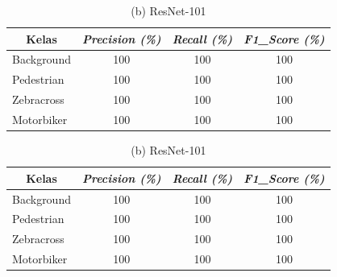 \begin{table}[!h]
	\centering
	\caption{{Perbandingan Hasil Evaluasi pada Pagi Hari}}
	\begin{minipage}[b]{\textwidth}
		\centering
		\caption*{(a) ResNet-50}
		\begin{tabular}{|l|c|c|c|}
			\hline
			\multicolumn{1}{|c|}{\textbf{Kelas}} & \textit{\textbf{Precision (\%)}} & \textit{\textbf{Recall (\%)}} & \textit{\textbf{F1\_Score (\%)}} \\ \hline
			Background                           & 100                              & 100                           & 100                              \\ \hline
			Pedestrian                           & 100                              & 100                           & 100                              \\ \hline
			Zebracross                           & 100                              & 100                           & 100                              \\ \hline
			Motorbiker                           & 100                              & 100                           & 100                              \\ \hline
		\end{tabular}
	\end{minipage}
	\vfill
	\begin{minipage}[b]{\textwidth}
		\centering
		\caption*{(b) ResNet-101}
		\begin{tabular}{|l|c|c|c|}
			\hline
			\multicolumn{1}{|c|}{\textbf{Kelas}} & \textit{\textbf{Precision (\%)}} & \textit{\textbf{Recall (\%)}} & \textit{\textbf{F1\_Score (\%)}} \\ \hline
			Background                           & 100                              & 100                           & 100                              \\ \hline
			Pedestrian                           & 100                              & 100                           & 100                              \\ \hline
			Zebracross                           & 100                              & 100                           & 100                              \\ \hline
			Motorbiker                           & 100                              & 100                           & 100                              \\ \hline
		\end{tabular}

\end{minipage}
\end{table}
